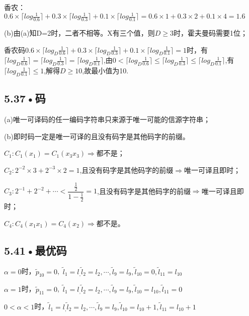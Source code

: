 \documentclass[UTF8]{ctexart}
\begin{document}
香农：$0.6\times \lceil log\frac{1}{0.6}\rceil+0.3\times \lceil log\frac{1}{0.3}\rceil+0.1\times \lceil log\frac{1}{0.1}\rceil=0.6\times 1+0.3\times 2+0.1\times 4=1.6  $

(b)由(a)知D=2时，二者不相等。X有三个值，则$D\geqslant 3$时，霍夫曼码需要1位；

香农码$0.6\times \lceil log_D\frac{1}{0.6}\rceil+0.3\times \lceil log_D\frac{1}{0.3}\rceil+0.1\times \lceil log_D\frac{1}{0.1}\rceil=1$时，有$\lceil log_D\frac{1}{0.6}\rceil =\lceil log_D\frac{1}{0.3}\rceil=\lceil log_D\frac{1}{0.1}\rceil$,由$0<\lceil log_D\frac{1}{0.6}\rceil\leqslant \lceil log_D\frac{1}{0.3}\rceil\leqslant \lceil log_D\frac{1}{0.1}\rceil$,有$\lceil log_D\frac{1}{0.1}\rceil\leqslant 1$,解得$D\geqslant 10$,故最小值为10.
\subsection*{5.37•码}
(a)唯一可译码的任一编码字符串只来源于唯一可能的信源字符串；

(b)即时码一定是唯一可译的且没有码字是其他码字的前缀。

$C_1:C_1(x_1)=C_1(x_3x_3)\Rightarrow$都不是；

$C_2:2^{-2}\times 3+ 2^{-3}\times 2 = 1$,且没有码字是其他码字的前缀$\Rightarrow$唯一可译且即时；

$C_3:2^{-1}+2^{-2}+\cdots < \dfrac{\frac{1}{2}}{1-\frac{1}{2}}=1$,且没有码字是其他码字的前缀$\Rightarrow$唯一可译且即时；

$C_4:C_4(x_1x_1)=C_4(x_2)\Rightarrow$都不是。

\subsection*{5.41•最优码}
$\alpha = 0 $时，$\tilde{p}_{10}=0$,\ $\tilde{l}_1=l_,\tilde{l}_2=l_2,\cdots , \tilde{l}_9=l_9,\tilde{l}_{10}=0,\tilde{l}_{11}=l_{10}$

$\alpha = 1 $时，$\tilde{p}_{11}=0$,\ $\tilde{l}_1=l_,\tilde{l}_2=l_2,\cdots , \tilde{l}_9=l_9,\tilde{l}_{10}=l_{10},\tilde{l}_{11}=0$

$0<\alpha <1 $时，$\tilde{l}_1=l_,\tilde{l}_2=l_2,\cdots , \tilde{l}_9=l_9,\tilde{l}_{10}=l_{10}+1,\tilde{l}_{11}=l_{10}+1$
\end{document}
